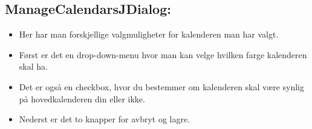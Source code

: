 \subsection{ManageCalendarsJDialog:}
\begin{itemize}
\item Her har man forskjellige valgmuligheter for kalenderen man har valgt. \item Først er det en drop-down-menu hvor man kan velge hvilken farge kalenderen skal ha.
\item Det er også en checkbox, hvor du bestemmer om kalenderen skal være synlig på hovedkalenderen din eller ikke. 
\item Nederst er det to knapper for avbryt og lagre. 
\end{itemize}
